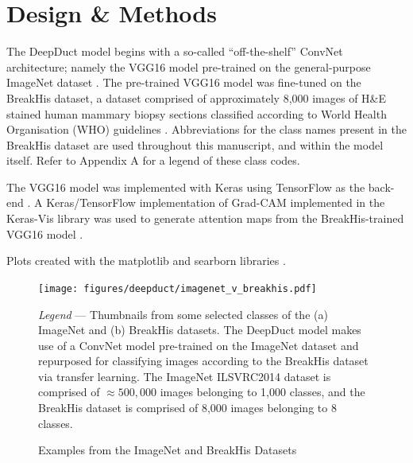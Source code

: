 \section{Design \& Methods}

The DeepDuct model begins with a so-called ``off-the-shelf'' ConvNet architecture; namely the VGG16 model pre-trained on the general-purpose ImageNet dataset \citep{simonyan2014,deng2009,imagenet}. The pre-trained VGG16 model was fine-tuned on the BreakHis dataset, a dataset comprised of approximately 8,000 images of H\&E stained human mammary biopsy sections classified according to World Health Organisation (WHO) guidelines \citep{spanhol2016, who_breast}. Abbreviations for the class names present in the BreakHis dataset are used throughout this manuscript, and within the model itself. Refer to Appendix A for a legend of these class codes. \par

The VGG16 model was implemented with Keras using TensorFlow as the back-end \citep{chollet2015, tensorflow}. A Keras/TensorFlow implementation of Grad-CAM implemented in the Keras-Vis library was used to generate attention maps from the BreakHis-trained VGG16 model \citep{raghakot}.\par

Plots created with the matplotlib and searborn libraries \citep{hunter2007, seaborn}.

\begin{figure}[h]
	\begin{center}
		\caption{Examples from the ImageNet and BreakHis Datasets \label{fig:imagenet_v_breakhis}}
	\end{center}
	\texttt{[image: figures/deepduct/imagenet\_v\_breakhis.pdf]}
	\begin{singlespace}
		\textit{Legend} --- Thumbnails from some selected classes of the (a) ImageNet and (b) BreakHis datasets. The DeepDuct model makes use of a ConvNet model pre-trained on the ImageNet dataset and repurposed for classifying images according to the BreakHis dataset via transfer learning. The ImageNet ILSVRC2014 dataset is comprised of $\approx500,000$ images belonging to 1,000 classes, and the BreakHis dataset is comprised of 8,000 images belonging to 8 classes. 
	\end{singlespace}
	
\end{figure}

